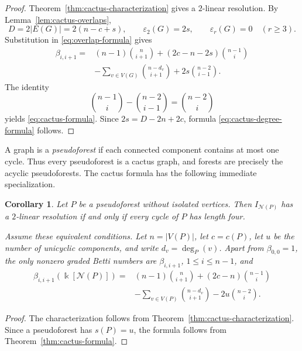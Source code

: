 \documentclass[11pt]{amsart}
\newtheorem{corollary}[theorem]{Corollary}
\theoremstyle{definition}
\theoremstyle{remark}
\numberwithin{equation}{section}
\newcommand{\NN}{\mathcal N}
\begin{document}
	\begin{proof}
		Theorem~\ref{thm:cactus-characterization} gives a \(2\)-linear resolution.
		By Lemma~\ref{lem:cactus-overlaps},
		\[
		D=2|E(G)|=2(n-c+s),\qquad
		\varepsilon_2(G)=2s,
		\qquad
		\varepsilon_r(G)=0\quad(r\ge3).
		\]
		Substitution in \eqref{eq:overlap-formula} gives
		\begin{align*}
		\beta_{i,i+1}
		={}&(n-1)\binom{n}{i+1}
		+(2c-n-2s)\binom{n-1}{i}\\
		&-\sum_{v\in V(G)}\binom{n-d_v}{i+1}
		+2s\binom{n-2}{i-1}.
		\end{align*}
		The identity
		\[
		\binom{n-1}{i}-\binom{n-2}{i-1}=\binom{n-2}{i}
		\]
		yields \eqref{eq:cactus-formula}. Since
		\(2s=D-2n+2c\), formula \eqref{eq:cactus-degree-formula} follows.
	\end{proof}

	A graph is a \emph{pseudoforest} if each connected component contains at most
	one cycle. Thus every pseudoforest is a cactus graph, and forests are precisely
	the acyclic pseudoforests. The cactus formula has the following immediate
	specialization.

	\begin{corollary}\label{cor:pseudoforest}
		Let \(P\) be a pseudoforest without isolated vertices. Then
		\(I_{\NN(P)}\) has a \(2\)-linear resolution if and only if every cycle of
		\(P\) has length four.

		Assume these equivalent conditions. Let \(n=|V(P)|\), let \(c=c(P)\), let
		\(u\) be the number of unicyclic components, and write
		\(d_v=\deg_P(v)\). Apart from \(\beta_{0,0}=1\), the only nonzero graded
		Betti numbers are \(\beta_{i,i+1}\), \(1\le i\le n-1\), and
		\begin{equation}\label{eq:pseudoforest-formula}
		\begin{aligned}
		\beta_{i,i+1}(\Bbbk[\NN(P)])
		={}&(n-1)\binom{n}{i+1}
		+(2c-n)\binom{n-1}{i}\\
		&-\sum_{v\in V(P)}\binom{n-d_v}{i+1}
		-2u\binom{n-2}{i}.
		\end{aligned}
		\end{equation}
	\end{corollary}

	\begin{proof}
		The characterization follows from Theorem~\ref{thm:cactus-characterization}.
		Since a pseudoforest has \(s(P)=u\), the formula follows from
		Theorem~\ref{thm:cactus-formula}.
	\end{proof}
\end{document}
